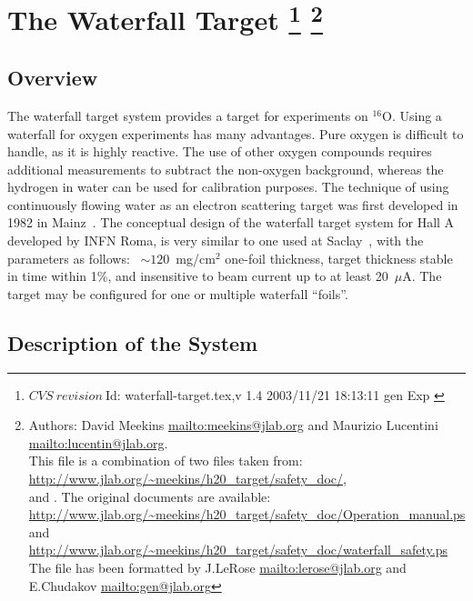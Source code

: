 \chapter[The Waterfall Target]{The Waterfall Target
\footnote{
  $CVS~revision~ $Id: waterfall-target.tex,v 1.4 2003/11/21 18:13:11 gen Exp $ $
}
\footnote{Authors: David Meekins \url{mailto:meekins@jlab.org} and 
 Maurizio Lucentini \url{mailto:lucentin@jlab.org}. \\
 This file is a combination of two files taken from: \\
 \url{http://www.jlab.org/~meekins/h20_target/safety_doc/},\\
   and .
  The original documents are available:\\
 \url{http://www.jlab.org/~meekins/h20_target/safety_doc/Operation_manual.ps} and\\
 \url{http://www.jlab.org/~meekins/h20_target/safety_doc/waterfall_safety.ps}\\
 The file has been formatted by J.LeRose \url{mailto:lerose@jlab.org}
 and E.Chudakov \url{mailto:gen@jlab.org}
}}

\section{Overview}
\label{sec:wt_overview}

The waterfall target system provides a target for experiments on 
$^{16}$O. Using a waterfall for oxygen experiments has many advantages. Pure 
oxygen is difficult to handle, as it is highly reactive. The use of other 
oxygen compounds requires additional measurements to subtract the non-oxygen 
background, whereas the hydrogen in water can be used for calibration purposes.
The technique of using continuously flowing water as an electron scattering 
target was first developed in 1982 in Mainz~\cite{Voegler:1982}.
The conceptual design of the waterfall target system for Hall A
developed by INFN Roma, 
is very similar to one used at Saclay~\cite{Garibaldi:1992mb},
with the parameters as follows: ~$\sim 120$~mg/cm$^{2}$ one-foil thickness,
target thickness stable in time within 1\%, and insensitive
to beam current up to at least 20~$\mu$A.
The target may be configured for one or multiple waterfall 
``foils''. 


\section{Description of the System}
\label{sec:wt_descrip_sys}

